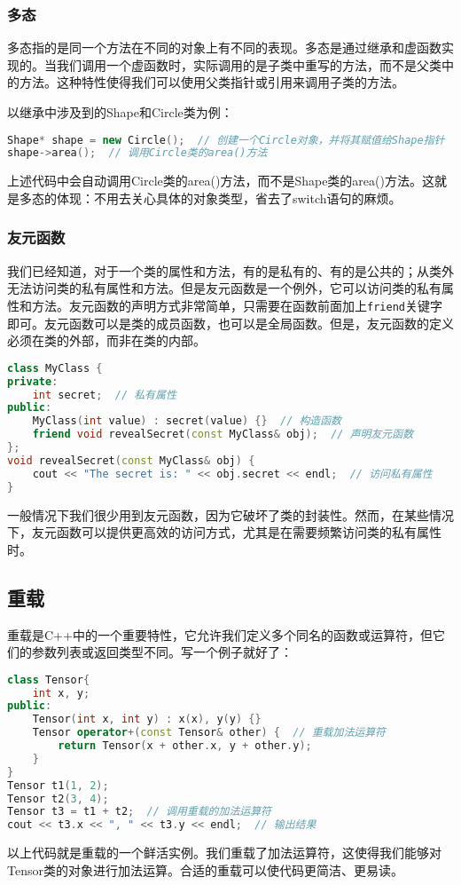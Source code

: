 \documentclass[../main.tex]{subfiles}
\begin{document}
\subsubsection{多态}

多态指的是同一个方法在不同的对象上有不同的表现。多态是通过继承和虚函数实现的。当我们调用一个虚函数时，实际调用的是子类中重写的方法，而不是父类中的方法。这种特性使得我们可以使用父类指针或引用来调用子类的方法。

以继承中涉及到的Shape和Circle类为例：
\begin{lstlisting}[language=C++]
Shape* shape = new Circle();  // 创建一个Circle对象，并将其赋值给Shape指针
shape->area();  // 调用Circle类的area()方法
\end{lstlisting}
上述代码中会自动调用Circle类的area()方法，而不是Shape类的area()方法。这就是多态的体现：不用去关心具体的对象类型，省去了switch语句的麻烦。

\subsubsection{友元函数}

我们已经知道，对于一个类的属性和方法，有的是私有的、有的是公共的；从类外无法访问类的私有属性和方法。但是友元函数是一个例外，它可以访问类的私有属性和方法。友元函数的声明方式非常简单，只需要在函数前面加上\texttt{friend}关键字即可。友元函数可以是类的成员函数，也可以是全局函数。但是，友元函数的定义必须在类的外部，而非在类的内部。
\begin{lstlisting}[language=C++]
class MyClass {
private:
    int secret;  // 私有属性
public:
    MyClass(int value) : secret(value) {}  // 构造函数
    friend void revealSecret(const MyClass& obj);  // 声明友元函数
};
void revealSecret(const MyClass& obj) {
    cout << "The secret is: " << obj.secret << endl;  // 访问私有属性
}
\end{lstlisting}

一般情况下我们很少用到友元函数，因为它破坏了类的封装性。然而，在某些情况下，友元函数可以提供更高效的访问方式，尤其是在需要频繁访问类的私有属性时。

\subsection{重载}

重载是C++中的一个重要特性，它允许我们定义多个同名的函数或运算符，但它们的参数列表或返回类型不同。写一个例子就好了：

\begin{lstlisting}[language=C++]
class Tensor{
    int x, y;
public:
    Tensor(int x, int y) : x(x), y(y) {}
    Tensor operator+(const Tensor& other) {  // 重载加法运算符
        return Tensor(x + other.x, y + other.y);
    }
}
Tensor t1(1, 2);
Tensor t2(3, 4);
Tensor t3 = t1 + t2;  // 调用重载的加法运算符
cout << t3.x << ", " << t3.y << endl;  // 输出结果
\end{lstlisting}
以上代码就是重载的一个鲜活实例。我们重载了加法运算符，这使得我们能够对Tensor类的对象进行加法运算。合适的重载可以使代码更简洁、更易读。
\end{document}

